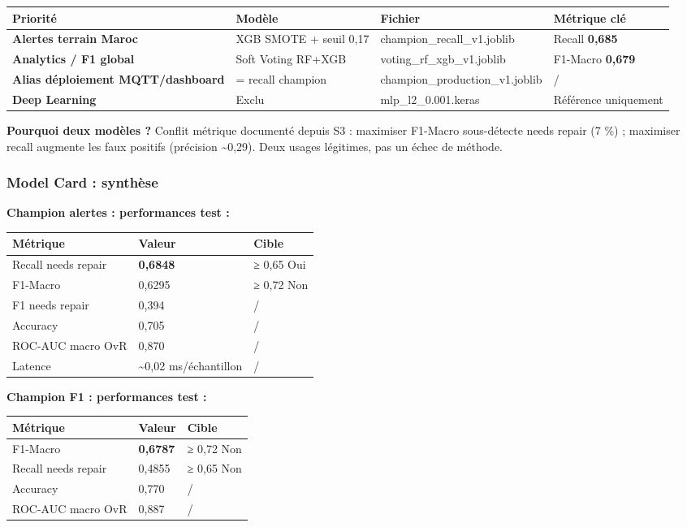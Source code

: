 \documentclass[11pt,a4paper]{report}
\begin{document}
\begin{longtable}{@{}llll@{}}
\toprule
Priorité & Modèle & Fichier & Métrique clé \\
\midrule
\textbf{Alertes terrain Maroc} & XGB SMOTE + seuil 0,17 & champion\_recall\_v1.joblib & Recall \textbf{0,685} \\
\textbf{Analytics / F1 global} & Soft Voting RF+XGB & voting\_rf\_xgb\_v1.joblib & F1-Macro \textbf{0,679} \\
\textbf{Alias déploiement MQTT/dashboard} & = recall champion & champion\_production\_v1.joblib & / \\
\textbf{Deep Learning} & Exclu & mlp\_l2\_0.001.keras & Référence uniquement \\
\bottomrule
\end{longtable}




\textbf{Pourquoi deux modèles ?} Conflit métrique documenté depuis S3 : maximiser F1-Macro sous-détecte needs repair (7 \%) ; maximiser recall augmente les faux positifs (précision \textasciitilde{}0,29). Deux usages légitimes, pas un échec de méthode.



\subsubsection{Model Card : synthèse}



\textbf{Champion alertes : performances test :}



\begin{longtable}{@{}lll@{}}
\toprule
Métrique & Valeur & Cible \\
\midrule
Recall needs repair & \textbf{0,6848} & ≥ 0,65 Oui \\
F1-Macro & 0,6295 & ≥ 0,72 Non \\
F1 needs repair & 0,394 & / \\
Accuracy & 0,705 & / \\
ROC-AUC macro OvR & 0,870 & / \\
Latence & \textasciitilde{}0,02 ms/échantillon & / \\
\bottomrule
\end{longtable}




\textbf{Champion F1 : performances test :}



\begin{longtable}{@{}lll@{}}
\toprule
Métrique & Valeur & Cible \\
\midrule
F1-Macro & \textbf{0,6787} & ≥ 0,72 Non \\
Recall needs repair & 0,4855 & ≥ 0,65 Non \\
Accuracy & 0,770 & / \\
ROC-AUC macro OvR & 0,887 & / \\
\bottomrule
\end{longtable}
\end{document}
